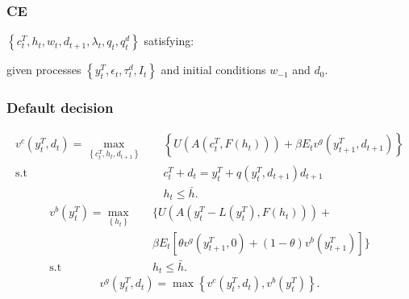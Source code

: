\documentclass[mathserif]{beamer}
\begin{document}
    \begin{frame}[allowframebreaks]
        \frametitle{CE}
        $\left\{ c^T_t, h_t, w_t, d_{t+1}, \lambda_t, q_t, q^d_t \right\}$ satisfying:
        \framebreak
        {\small
            
        }
        \framebreak
        given processes $\left\{ y^T_t, \epsilon_t, \tau^d_t, I_t \right\}$ and initial conditions $w_{-1}$ and $d_0$.
    \end{frame}

    \begin{frame}
        \frametitle{Default decision}
               \small
            \begin{equation}
                \label{eq:vc}
                \begin{aligned}
                    v^c(y^T_t, d_t) = \max_{\left\{ c^T_t, h_t, d_{t+1} \right\}} \quad
                    &\left\{
                        U\left(
                            A\left(c^T_t, F(h_t)\right)
                        \right)
                        + \beta E_t
                        v^g \left(
                            y^T_{t+1}, d_{t+1}
                        \right)
                    \right\}\\
                    \text{s.t} \quad& c^T_t + d_t = y^T_t + q(y^T_t, d_{t+1}) d_{t+1} \\
                                & h_t \le \bar{h}.
                \end{aligned}
            \end{equation}
            \begin{equation}
                \label{eq:vb}
                \begin{split}
                    v^b(y^T_t) = \max_{\left\{ h_t \right\}} \quad
                    &\Bigg\{
                        U\left(
                            A\left( y^T_t - L(y^T_t), F(h_t)\right)
                        \right)
                        + \\
                        & \beta E_t \left[
                            \theta v^g \left(
                                y^T_{t+1}, 0
                            \right)
                            + (1-\theta) v^b \left(
                                y^{T}_{t+1}
                            \right)
                        \right]
                    \Bigg\}\\
                    \text{s.t} \quad& h_t \le \bar{h}.
                \end{split}
            \end{equation}
            \begin{equation}
                \label{eq:vg}
                v^g(y^T_t, d_t) = \max\left\{
                    v^c(y^T_t, d_t) ,
                    v^b(y^T_t)
                \right\}.
            \end{equation}
    \end{frame}
\end{document}
